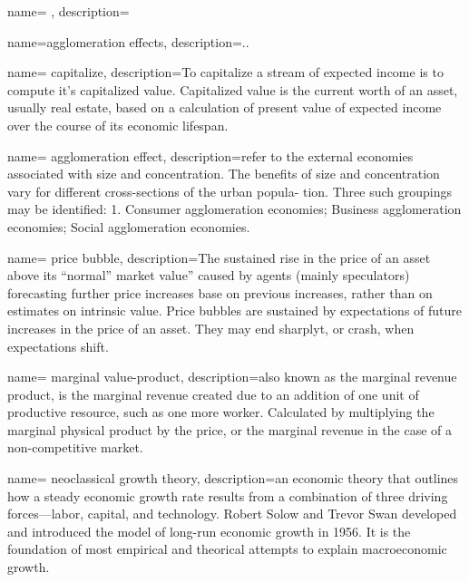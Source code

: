 

\newglossaryentry{}
{
name= ,
description={}
}




{
name=agglomeration effects,
description={..}
}

{
name= capitalize,
description={To capitalize a stream of expected income is to compute it's capitalized value. Capitalized value is the current worth of an asset, usually real estate, based on a calculation of present value of expected income over the course of its economic lifespan. }
}

{
name= agglomeration effect,
description={refer to the external economies associated with size and concentration. The benefits of size and concentration vary for different cross-sections of the urban popula- tion. Three such groupings may be identified: 1. Consumer agglomeration economies; Business agglomeration economies; Social agglomeration economies.\cite{carlinoAgglomerationEconomiesSurvey1978}}
}

{
name= price bubble,
description={The sustained rise in the price of an asset above its ``normal'' market value'' caused by agents (mainly speculators) forecasting further price increases base on previous increases, rather than on estimates on intrinsic value.  Price bubbles are sustained by expectations of future increases in the price of an asset. They may end sharplyt, or crash, when expectations shift.}
}

{
name= marginal value-product,
description={also known as the marginal revenue product, is the marginal revenue created due to an addition of one unit of productive resource, such as one more worker. Calculated by multiplying the marginal physical product by the price, or the marginal revenue in the case of a non-competitive market. }
}


{
name= neoclassical growth theory,
description={an economic theory that outlines how a steady economic growth rate results from a combination of three driving forces—labor, capital, and technology. Robert Solow and Trevor Swan developed and introduced the model of long-run economic growth in 1956. It is the  foundation of most empirical and theorical attempts to explain macroeconomic growth.}
}

